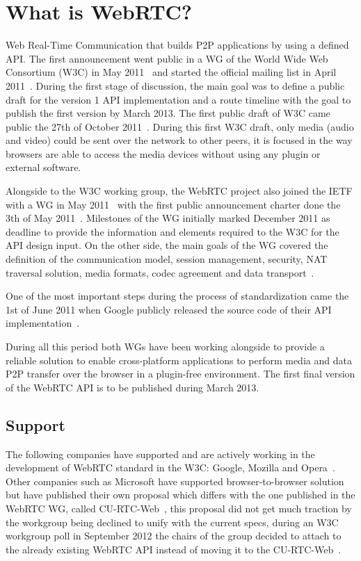 \section{What is WebRTC?}

\thispagestyle{empty}

Web Real-Time Communication that builds P2P applications by using a defined API. The first announcement went public in a WG of the World Wide Web Consortium (W3C) in May 2011~\cite{webrtcW3cgroup} and started the official mailing list in April 2011~\cite{welcomeW3C}. During the first stage of discussion, the main goal was to define a public draft for the version 1 API implementation and a route timeline with the goal to publish the first version by March 2013. The first public draft of W3C came public the 27th of October 2011~\cite{originalW3Cdraft}. During this first W3C draft, only media (audio and video) could be sent over the network to other peers, it is focused in the way browsers are able to access the media devices without using any plugin or external software.

Alongside to the W3C working group, the WebRTC project also joined the IETF with a WG in May 2011~\cite{webrtcIETFgroup} with the first public announcement charter done the 3th of May 2011~\cite{webrtcIETFcharter}. Milestones of the WG initially marked December 2011 as deadline to provide the information and elements required to the W3C for the API design input. On the other side, the main goals of the WG covered the definition of the communication model, session management, security, NAT traversal solution, media formats, codec agreement and data transport~\cite{webrtcIETFcharter}.

One  of the most important steps during the process of standardization came the 1st of June 2011 when Google publicly released the source code of their API implementation~\cite{haraldpublicWebRTC}. 

During all this period both WGs have been working alongside to provide a reliable solution to enable cross-platform applications to perform media and data P2P transfer over the browser in a plugin-free environment. The first final version of the WebRTC API is to be published during March 2013.

\subsection{Support}

The following companies have supported and are actively working in the development of WebRTC standard in the W3C: Google, Mozilla and Opera~\cite{googleAnnouncement}. Other companies such as Microsoft have supported browser-to-browser solution but have published their own proposal which differs with the one published in the WebRTC WG, called CU-RTC-Web~\cite{curtcweb}, this proposal did not get much traction by the workgroup being declined to unify with the current specs, during an W3C workgroup poll in September 2012 the chairs of the group decided to attach to the already existing WebRTC API instead of moving it to the CU-RTC-Web~\cite{curtcpoll}.

